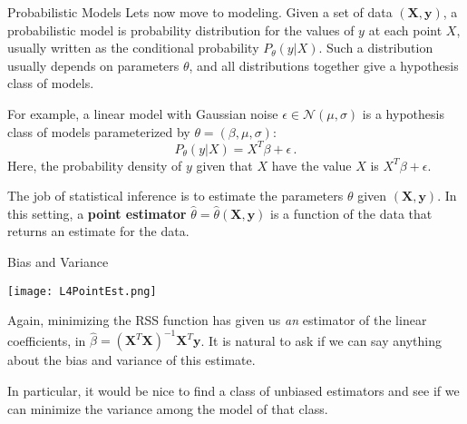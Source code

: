 \documentclass[10pt, table, dvipsnames,xcdraw,handout]{beamer}
\begin{document}
\begin{frame}[fragile]{Probabilistic Models} 
Lets now move to modeling. Given a set of data $(\mathbf{X},\mathbf{y})$, a probabilistic model is probability distribution for the values of $y$ at each point $X$, usually written as the conditional probability $P_\theta(y|X)$. Such a distribution usually depends on parameters $\theta$, and all distributions together give a hypothesis class of models. \pause

For example, a linear model with Gaussian noise $\epsilon \in \mathcal{N}(\mu,\sigma)$ is a hypothesis class of models parameterized by $\theta = (\beta,\mu,\sigma)$:
$$
P_\theta(y|X) = X^T\beta + \epsilon\,.
$$
Here, the probability density of $y$ given that $X$ have the value $X$ is $X^T\beta + \epsilon$.\pause

The job of statistical inference is to estimate the parameters $\theta$ given $(\mathbf{X},\mathbf{y})$. In this setting, a \textbf{point estimator} $\hat{\theta} = \hat{\theta}(\mathbf{X},\mathbf{y})$ is a function of the data that returns an estimate for the data.
\end{frame}





\begin{frame}[fragile]{Bias and Variance} 
  \begin{minipage}[t][0.5\textheight][t]{\textwidth}
	\centering \texttt{[image: L4PointEst.png]} 
  \end{minipage}
  \vfill
\begin{minipage}[t][0.5\textheight][t]{\textwidth}
Again, minimizing the RSS function has given us \emph{an} estimator of the linear coefficients, in $\hat{\beta}=(\mathbf{X}^T\mathbf{X})^{-1}\mathbf{X}^T\mathbf{y}$. It is natural to ask if we can say anything about the bias and variance of this estimate. 

In particular, it would be nice to find a class of unbiased estimators and see if we can minimize the variance among the model of that class. 
\end{minipage}
\end{frame}
\end{document}
